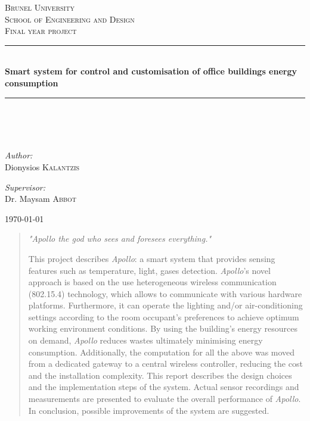 \documentclass[12pt,a4paper,draft]{report}
\author{Student: Dionisios Kalantzis (SID:0733139) \\ Supervisor: Dr. Maysam Abbod}
\begin{document}
\onehalfspacing
\begin{titlepage}
\begin{center}
%
\textsc{\LARGE Brunel University}\\[1.5cm]
\textsc{\LARGE School of Engineering and Design}\\[1cm]
%
\textsc{\Large Final year project}\\[1cm]
\hrule
\hfill\\[0.5cm]
{ \huge \bfseries Smart system for control and customisation of office buildings energy consumption}\\[0.5cm]
\hrule
\hfill\\[0.5cm]
\ \\
\hfill\\[0.2cm]
\begin{minipage}{0.4\textwidth}
\begin{flushleft} \large
\emph{Author:}\\
Dionysios \textsc{Kalantzis}
\end{flushleft}
\end{minipage}
\begin{minipage}{0.4\textwidth}
\begin{flushright} \large
\emph{Supervisor:} \\
Dr. Maysam \textsc{Abbot}
\end{flushright}
\end{minipage}
\vfill
{\large \today}
\end{center}
\end{titlepage}
\newpage
%
\newpage
\begin{abstract}
\begin{center}
\emph{"Apollo the god who sees and foresees everything."}
\end{center}
%
This project describes \emph{Apollo}: a smart system that provides sensing features such as temperature, light, gases detection.
\emph{Apollo}'s novel approach is based on the use heterogeneous wireless communication (802.15.4) technology, which allows to communicate with various hardware platforms. 
Furthermore, it can operate the lighting and/or air-conditioning settings according to the room occupant's preferences to achieve optimum working environment conditions.
By using the building's energy resources on demand, \emph{Apollo} reduces wastes ultimately minimising energy consumption. 
Additionally, the computation for all the above was moved from a dedicated gateway to a central wireless controller, reducing the cost and the installation complexity. 
This report describes the design choices and the implementation steps of the system.
Actual sensor recordings and measurements are presented to evaluate the overall performance of \emph{Apollo}.
In conclusion, possible improvements of the system are suggested.

\end{abstract}
\end{document}
